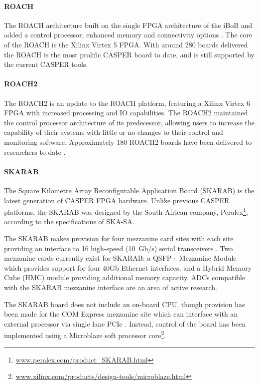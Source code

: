 \documentclass{ws-jai}
\begin{document}
\paragraph*{ROACH}
The ROACH architecture built on the single FPGA architecture of the iBoB and added a control processor, enhanced memory and connectivity options \citep{Casp09}. The core of the ROACH is the Xilinx Virtex 5 FPGA. With around 280 boards delivered \citep{private-mo} the ROACH is the most prolific CASPER board to date, and is still supported by the current CASPER tools.
\paragraph*{ROACH2}
The ROACH2 is an update to the ROACH platform, featuring a Xilinx Virtex 6 FPGA with increased processing and IO capabilities. The ROACH2 maintained the control processor architecture of its predecessor, allowing users to increase the capability of their systems with little or no changes to their control and monitoring software. Approximately 180 ROACH2 boards have been delivered to researchers to date \citep{private-mo}.
\paragraph*{SKARAB}
The Square Kilometre Array Reconfigurable Application Board (SKARAB) is the latest generation of CASPER FPGA hardware. Unlike previous CASPER platforms, the SKARAB was designed by the South African company, Peralex\footnote{\url{www.peralex.com/product_SKARAB.html}}, according to the specifications of SKA-SA.

The SKARAB makes provision for four mezzanine card sites with each site providing an interface to 16 high-speed (10~Gb/s) serial transceivers \citep{cliff16}.
Two mezzanine cards currently exist for SKARAB: a QSFP+ Mezzanine Module which provides support for four 40Gb Ethernet interfaces, and a Hybrid Memory Cube (HMC) module providing additional memory capacity. ADCs compatible with the SKARAB mezzanine interface are an area of active research.

The SKARAB board does not include an on-board CPU, though provision has been made for the COM Express mezzanine site which can interface with an external processor via single lane PCIe \citep{Teag15}. Instead, control of the board has been implemented using a Microblaze soft processor core\footnote{\url{www.xilinx.com/products/design-tools/microblaze.html}}.
\end{document}
